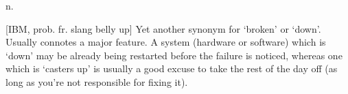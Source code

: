  n.

[IBM, prob. fr. slang belly up] Yet another synonym for `broken' or `down'.
Usually connotes a major feature. A system (hardware or software) which is
`down' may be already being restarted before the failure is noticed, whereas one
which is `casters up' is usually a good excuse to take the rest of the day off
(as long as you're not responsible for fixing it).

